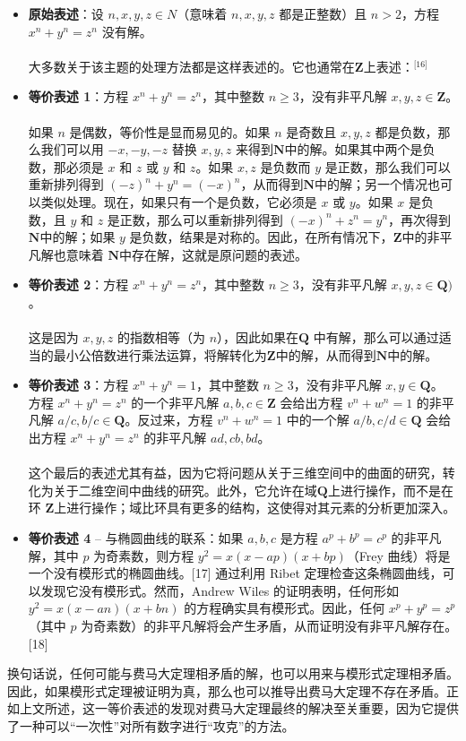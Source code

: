 \begin{itemize}
\item \textbf{原始表述}：设 \( n, x, y, z \in N \)（意味着 \( n, x, y, z \) 都是正整数）且 \( n > 2 \)，方程 \( x^n + y^n = z^n \) 没有解。\\\\  
大多数关于该主题的处理方法都是这样表述的。它也通常在\( \mathbf{Z} \)上表述：\(^\text{[16]}\)
\item \textbf{等价表述 1}：方程 \( x^n + y^n = z^n \)，其中整数 \( n \geq 3 \)，没有非平凡解 \( x, y, z \in \mathbf{Z} \)。\\\\  
如果 \( n \) 是偶数，等价性是显而易见的。如果 \( n \) 是奇数且 \( x, y, z \) 都是负数，那么我们可以用 \( -x, -y, -z \) 替换 \( x, y, z \) 来得到\( \mathbf{N} \)中的解。如果其中两个是负数，那必须是 \( x \) 和 \( z \) 或 \( y \) 和 \( z \)。如果 \( x, z \) 是负数而 \( y \) 是正数，那么我们可以重新排列得到 \( (-z)^n + y^n = (-x)^n \)，从而得到\( \mathbf{N} \)中的解；另一个情况也可以类似处理。现在，如果只有一个是负数，它必须是 \( x \) 或 \( y \)。如果 \( x \) 是负数，且 \( y \) 和 \( z \) 是正数，那么可以重新排列得到 \( (-x)^n + z^n = y^n \)，再次得到\( \mathbf{N} \)中的解；如果 \( y \) 是负数，结果是对称的。因此，在所有情况下，\( \mathbf{Z} \)中的非平凡解也意味着 \( \mathbf{N} \)中存在解，这就是原问题的表述。
\item \textbf{等价表述 2}：方程 \( x^n + y^n = z^n \)，其中整数 \( n \geq 3 \)，没有非平凡解 \( x, y, z \in \mathbf{Q}) \)。\\\\ 
这是因为 \( x, y, z \) 的指数相等（为 \( n \)），因此如果在\( \mathbf{Q} \) 中有解，那么可以通过适当的最小公倍数进行乘法运算，将解转化为\( \mathbf{Z} \)中的解，从而得到\( \mathbf{N} \)中的解。
\item \textbf{等价表述 3}：方程 \( x^n + y^n = 1 \)，其中整数 \( n \geq 3 \)，没有非平凡解 \( x, y \in \mathbf{Q} \)。\\  
方程 \( x^n + y^n = z^n \) 的一个非平凡解 \( a, b, c \in \mathbf{Z} \) 会给出方程 \( v^n + w^n = 1 \) 的非平凡解 \( a/c, b/c \in \mathbf{Q}\)。反过来，方程 \( v^n + w^n = 1 \) 中的一个解 \( a/b, c/d \in \mathbf{Q}\) 会给出方程 \( x^n + y^n = z^n \) 的非平凡解 \( ad, cb, bd \)。\\\\
这个最后的表述尤其有益，因为它将问题从关于三维空间中的曲面的研究，转化为关于二维空间中曲线的研究。此外，它允许在域\( \mathbf{Q} \)上进行操作，而不是在环 \( \mathbf{Z} \)上进行操作；域比环具有更多的结构，这使得对其元素的分析更加深入。
\item \textbf{等价表述 4} – 与椭圆曲线的联系：如果 \( a, b, c \) 是方程 \( a^p + b^p = c^p \) 的非平凡解，其中 \( p \) 为奇素数，则方程 \( y^2 = x(x - ap)(x + bp) \)（Frey 曲线）将是一个没有模形式的椭圆曲线。[17]  
通过利用 Ribet 定理检查这条椭圆曲线，可以发现它没有模形式。然而，Andrew Wiles 的证明表明，任何形如 \( y^2 = x(x - an)(x + bn) \) 的方程确实具有模形式。因此，任何 \( x^p + y^p = z^p \)（其中 \( p \) 为奇素数）的非平凡解将会产生矛盾，从而证明没有非平凡解存在。[18]
\end{itemize}


换句话说，任何可能与费马大定理相矛盾的解，也可以用来与模形式定理相矛盾。因此，如果模形式定理被证明为真，那么也可以推导出费马大定理不存在矛盾。正如上文所述，这一等价表述的发现对费马大定理最终的解决至关重要，因为它提供了一种可以“一次性”对所有数字进行“攻克”的方法。